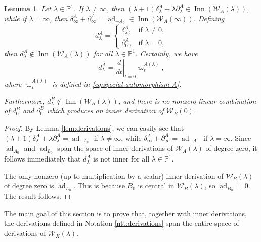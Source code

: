 \documentclass[11pt, svgnames]{amsart}
\DeclareMathOperator{\ad}{ad}
\newcommand{\PP}{\mathbb{P}}
\newcommand{\W}{\mathcal{W}}
\DeclareMathOperator{\Inn}{Inn}
\newcommand{\del}{\partial}
\newcommand{\diffeval}[2]{\left.\frac{d}{d#1}\right|_{#1=#2}}
\newtheorem{lemma}[proposition]{Lemma}
\theoremstyle{definition}
\begin{document}
\begin{lemma}\label{lem:inner derivations}
    Let $\lambda \in \PP^1$. If $\lambda \neq \infty$, then $(\lambda + 1)\delta_\lambda^A + \lambda \del_\lambda^A \in \Inn(\W_A(\lambda))$, while if $\lambda = \infty$, then $\delta_\infty^A + \del_\infty^A = \ad_{-A_0} \in \Inn(\W_A(\infty))$. Defining
    $$d_\lambda^A = \begin{cases}
        \delta_\lambda^A, &\text{if } \lambda \neq 0, \\
        \del_0^A, &\text{if } \lambda = 0,
    \end{cases}$$
    then $d_\lambda^A \notin \Inn(\W_A(\lambda))$ for all $\lambda \in \PP^1$. Certainly, we have
    $$d_\lambda^A = \diffeval{t}{0}\varpi_t^{A(\lambda)},$$
    where $\varpi_t^{A(\lambda)}$ is defined in \eqref{eq:special automorphism A}.

    Furthermore, $d_\lambda^B \notin \Inn(\W_B(\lambda))$, and there is no nonzero linear combination of $d_0^B$ and $\del^B_0$ which produces an inner derivation of $\W_B(0)$.
\end{lemma}
\begin{proof}
    By Lemma \ref{lem:derivations}, we can easily see that $(\lambda + 1)\delta_\lambda^A + \lambda \del_\lambda^A = \ad_{-A_0}$ if $\lambda \neq \infty$, while $\delta_\infty^A + \del_\infty^A = \ad_{-A_0}$ if $\lambda = \infty$. Since $\ad_{A_0}$ and $\ad_{L_0}$ span the space of inner derivations of $\W_A(\lambda)$ of degree zero, it follows immediately that $d_\lambda^A$ is not inner for all $\lambda \in \PP^1$.

    The only nonzero (up to multiplication by a scalar) inner derivation of $\W_B(\lambda)$ of degree zero is $\ad_{L_0}$. This is because $B_0$ is central in $\W_B(\lambda)$, so $\ad_{B_0} = 0$. The result follows.
\end{proof}

The main goal of this section is to prove that, together with inner derivations, the derivations defined in Notation \ref{ntt:derivations} span the entire space of derivations of $\W_X(\lambda)$.
\end{document}
